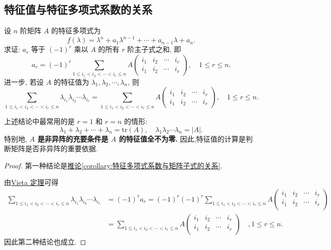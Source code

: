 \documentclass[../../main.tex]{subfiles}
\begin{document}
\subsection{特征值与特征多项式系数的关系}

\begin{proposition}[特征值与特征多项式系数的关系]\label{proposition:特征值与特征多项式系数的关系}
设 $n$ 阶矩阵 $A$ 的特征多项式为
\[
f(\lambda) = \lambda^n + a_1 \lambda^{n-1} + \cdots + a_{n-1} \lambda + a_n.
\]
求证: $a_r$ 等于 $(-1)^r$ 乘以 $A$ 的所有 $r$ 阶主子式之和, 即
\[
a_r = (-1)^r \sum_{1 \leq i_1 < i_2 < \cdots < i_r \leq n}  A
\begin{pmatrix}
i_1 & i_2 & \cdots & i_r \\
i_1 & i_2 & \cdots & i_r
\end{pmatrix}, \quad 1 \leq r \leq n.
\]
进一步, 若设 $A$ 的特征值为 $\lambda_1, \lambda_2, \cdots, \lambda_n$, 则
\[
\sum_{1 \leq i_1 < i_2 < \cdots < i_r \leq n} \lambda_{i_1} \lambda_{i_2} \cdots \lambda_{i_r} = \sum_{1 \leq i_1 < i_2 < \cdots < i_r \leq n} A
\begin{pmatrix}
i_1 & i_2 & \cdots & i_r \\
i_1 & i_2 & \cdots & i_r
\end{pmatrix}, \quad 1 \leq r \leq n.
\]
\end{proposition}
\begin{remark}
上述结论中最常用的是 $r = 1$ 和 $r = n$ 的情形:
\[
\lambda_1 + \lambda_2 + \cdots + \lambda_n = \mathrm{tr}(A), \quad \lambda_1 \lambda_2 \cdots \lambda_n = |A|.
\]
特别地,\textbf{ $A$ 是非异阵的充要条件是 $A$ 的特征值全不为零.} 因此,特征值的计算是判断矩阵是否非异阵的重要依据.
\end{remark}
\begin{proof}
第一种结论是\hyperref[corollary:特征多项式系数与矩阵子式的关系]{推论\ref{corollary:特征多项式系数与矩阵子式的关系}}. 

由\hyperref[theorem:Vieta定理]{Vieta 定理}可得
\begin{align*}
\sum_{1\le i_1<i_2<\cdots <i_r\le n}{\lambda _{i_1}\lambda _{i_2}}\cdots \lambda _{i_r}&=\left( -1 \right) ^ra_r=\left( -1 \right) ^r\left( -1 \right) ^r\sum_{1\le i_1<i_2<\cdots <i_r\le n}{A\left( \begin{matrix}
i_1&		i_2&		\cdots&		i_r\\
i_1&		i_2&		\cdots&		i_r\\
\end{matrix} \right)}
\\
&=\sum_{1\le i_1<i_2<\cdots <i_r\le n}{A\left( \begin{matrix}
i_1&		i_2&		\cdots&		i_r\\
i_1&		i_2&		\cdots&		i_r\\
\end{matrix} \right)}\quad ,1\le r\le n.
\end{align*}
因此第二种结论也成立.
\end{proof}
\end{document}
